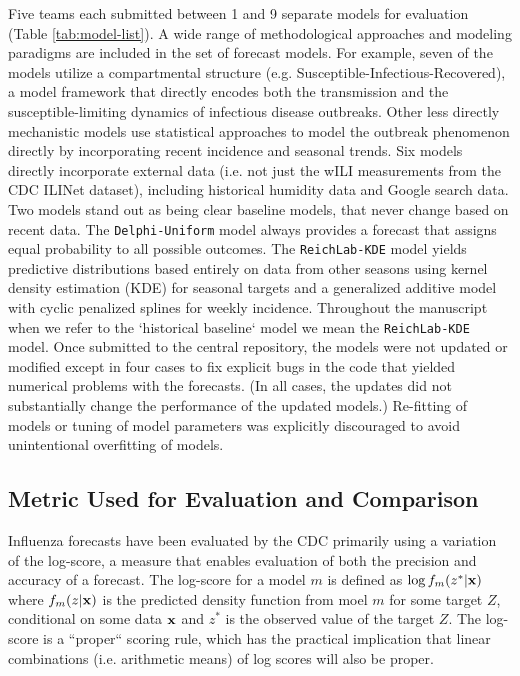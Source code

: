 \documentclass{article}\usepackage[]{graphicx}\usepackage[]{color}
\begin{document}
Five teams each submitted between 1 and 9 separate models for evaluation (Table \ref{tab:model-list}). 
A wide range of methodological approaches and modeling paradigms are included in the set of forecast models.
For example, seven of the models utilize a compartmental structure (e.g. Susceptible-Infectious-Recovered), a model framework that directly encodes both the transmission and the susceptible-limiting dynamics of infectious disease outbreaks.
Other less directly mechanistic models use statistical approaches to model the outbreak phenomenon directly by incorporating recent incidence and seasonal trends.
Six models directly incorporate external data (i.e. not just the wILI measurements from the CDC ILINet dataset), including historical humidity data and Google search data.
Two models stand out as being clear baseline models, that never change based on recent data. 
The {\tt Delphi-Uniform} model always provides a forecast that assigns equal probability to all possible outcomes. 
The {\tt ReichLab-KDE} model yields predictive distributions based entirely on data from other seasons using kernel density estimation (KDE) for seasonal targets and a generalized additive model with cyclic penalized splines for weekly incidence.
Throughout the manuscript when we refer to the `historical baseline` model we mean the {\tt ReichLab-KDE} model.
Once submitted to the central repository, the models were not updated or modified except in four cases to fix explicit bugs in the code that yielded numerical problems with the forecasts. 
(In all cases, the updates did not substantially change the performance of the updated models.)
Re-fitting of models or tuning of model parameters was explicitly discouraged to avoid unintentional overfitting of models.



\subsection{Metric Used for Evaluation and Comparison}

Influenza forecasts have been evaluated by the CDC primarily using a variation of the log-score, a measure that enables evaluation of both the precision and accuracy of a forecast.\cite{Gneiting2007} 
The log-score for a model $m$ is defined as $\log f_m(z^*|\bf{x})$ where $f_m(z|\bf{x})$ is the predicted density function from moel $m$ for some target $Z$, conditional on some data $\bf{x}$ and $z^*$ is the observed value of the target $Z$. 
The log-score is a ``proper`` scoring rule, which has the practical implication that linear combinations (i.e. arithmetic means) of log scores will also be proper.
\end{document}
